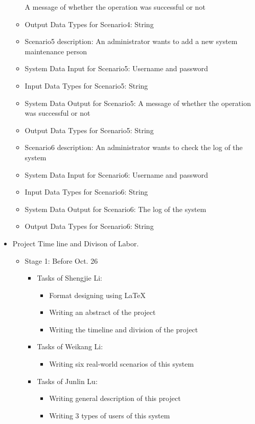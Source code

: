 \begin{itemize}
\begin{itemize}
	A message of whether the operation was successful or not
	\item{Output Data Types for Scenario4: }
	String
	\item{Scenario5 description: }
	An administrator wants to add a new system maintenance person
	\item{System Data Input for Scenario5: }
	Username and password  
	\item{Input Data Types for Scenario5: }
	String
	\item{System Data Output for Scenario5: }
	A message of whether the operation was successful or not
	\item{Output Data Types for Scenario5: }
	String
	\item{Scenario6 description: }
	An administrator wants to check the log of the system
	\item{System Data Input for Scenario6: }
	Username and password
	\item{Input Data Types for Scenario6: }
	String
	\item{System Data Output for Scenario6: }
	The log of the system
	\item{Output Data Types for Scenario6: }
	String
	\end{itemize}
\item{Project Time line and Divison of Labor.}
\begin{itemize}
	\item {Stage 1: Before Oct. 26} 
	\begin{itemize}
		\item {Tasks of Shengjie Li:}
		\begin{itemize}
			\item {Format designing using \LaTeX}
			\item {Writing an abstract of the project}
			\item {Writing the timeline and division of the project}
		\end{itemize}
		\item {Tasks of Weikang Li:}
		\begin{itemize}
			\item {Writing six real-world scenarios of this system}
		\end{itemize}
		\item {Tasks of Junlin Lu:}
		\begin{itemize}
			\item {Writing general description of this project}
			\item {Writing 3 types of users of this system}

\end{itemize}
\end{itemize}
\end{itemize}
\end{itemize}
